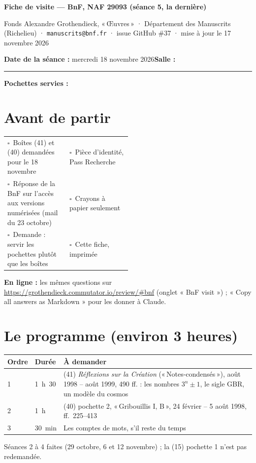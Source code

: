 \documentclass[10pt,a4paper]{article}
\newcommand{\cb}{$\square$}
\newcommand{\q}[1]{«\,#1\,»}
\begin{document}
{\Large\bfseries Fiche de visite --- BnF, NAF 29093 (séance 5, la dernière)}\par
{\small Fonds Alexandre Grothendieck, «\,Œuvres\,» · Département des Manuscrits (Richelieu) · \texttt{manuscrits@bnf.fr} · issue GitHub \#37 · mise à jour le 17 novembre 2026}\par
\medskip
\textbf{Date de la séance :} mercredi 18 novembre 2026\quad \textbf{Salle :} \rule{2.5cm}{0.4pt}\quad \textbf{Pochettes servies :} \hrulefill

\section*{Avant de partir}
\begin{tabularx}{\linewidth}{@{}p{0.5\linewidth}Y@{}}
\cb\ Boîtes (41) et (40) demandées pour le 18 novembre & \cb\ Pièce d'identité, Pass Recherche \\
\cb\ Réponse de la BnF sur l'accès aux versions numérisées (mail du 23 octobre) & \cb\ Crayons à papier seulement \\
\cb\ Demande : servir les pochettes plutôt que les boîtes & \cb\ Cette fiche, imprimée
\end{tabularx}

\textbf{En ligne :} les mêmes questions sur \url{https://grothendieck.commutator.io/review/#bnf} (onglet « BnF visit ») ; « Copy all answers as Markdown » pour les donner à Claude.

\section*{Le programme (environ 3 heures)}
\renewcommand{\arraystretch}{1.3}
\begin{tabularx}{\linewidth}{|p{1.6cm}|p{2.2cm}|Y|}\hline
\textbf{Ordre} & \textbf{Durée} & \textbf{À demander} \\  & 1~h~30 & (41) \emph{Réflexions sur la Création} (\q{Notes-condensés}), août 1998 -- août 1999, 490 ff. : les nombres $3^n \pm 1$, le sigle GBR, un modèle du cosmos \\  & 1~h & (40) pochette 2, \q{Gribouillis I, B}, 24 février -- 5 août 1998, ff.~225--413 \\  & 30~min & Les comptes de mots, s'il reste du temps \\ \hline
\end{tabularx}

Séances 2 à 4 faites (29 octobre, 6 et 12 novembre) ; la (15) pochette 1 n'est pas redemandée.
\end{document}
